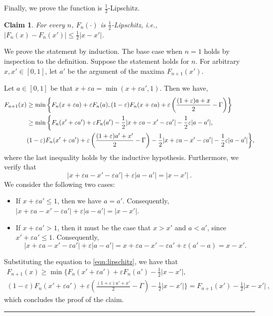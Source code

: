 \documentclass[11pt,letterpaper]{article}
\newenvironment{proof}{{\bf Proof:  }}{\hfill\rule{2mm}{2mm}\vspace*{5pt}}
\newtheorem{claim}{Claim}[section]
\newcommand{\eps}{\varepsilon}
\begin{document}
Finally, we prove the function is $\frac{1}{2}$-Lipschitz.
\begin{claim}
\label{cl:lipschitz}
For every $n$, $F_n(\cdot)$ is $\frac{1}{2}$-Lipschitz, i.e., $|F_n(x)-F_n(x')| \le \frac{1}{2} |x-x'|$.
\end{claim}
\begin{proof} 
We prove the statement by induction. The base case when $n=1$ holds by inspection to the definition. 
Suppose the statement holds for $n$. For arbitrary $x,x' \in [0,1]$, let $a'$ be the argument of the maxima $F_{n+1}(x')$. 


Let $a \in [0,1]$ be that $x+\eps a = \min(x+\eps a',1)$. Then we have,
\begin{align}
F_{n+1}(x) & \ge \min \left\{F_n(x+\eps a)+\eps F_n(a),  (1-\eps) F_n(x+\eps a) + \eps\left(\frac{(1+\eps)a + x}{2} - \Gamma \right) \right\} \notag \\
& \ge \min \bigg\{ F_n(x'+\eps a')+\eps F_n(a') - \frac{1}{2} |x+\eps a-x'-\eps a'| - \frac{1}{2} \eps |a-a'| , \notag \\
&  (1-\eps)F_n(x'+\eps a') + \eps \left(\frac{(1+\eps)a' + x'}{2} - \Gamma \right) - \frac{1}{2} |x+\eps a-x'-\eps a'| - \frac{1}{2} \eps|a-a'| \bigg\}, 
\label{eqn:lipschitz}
\end{align}
where the last inequality holds by the inductive hypothesis. Furthermore, we verify that
\[
|x+\eps a-x'-\eps a'|+\eps|a-a'| = |x-x'|~.
\]
We consider the following two cases:
\begin{itemize}
\item If $x+\eps a' \le 1$, then we have $a=a'$.	 Consequently, $|x+\eps a-x'-\eps a'| + \eps |a-a'| = |x-x'|$.
\item If $x+\eps a' > 1$, then it must be the case that $x>x'$ and $a<a'$, since $x'+\eps a'\le 1$. Consequently,
\[
|x+\eps a-x'-\eps a'| + \eps |a-a'| = x+\eps a - x'-\eps a' + \eps (a'-a) = x-x'.
\]
\end{itemize}
Substituting the equation to \eqref{eqn:lipschitz}, we have that
\begin{multline*}
F_{n+1}(x) \ge \min \Big\{ F_n(x'+\eps a')+\eps F_n(a') - \frac{1}{2} |x-x'|, \\
 (1-\eps)F_n(x'+\eps a') + \eps \left(\frac{(1+\eps)a' + x'}{2} - \Gamma \right) - \frac{1}{2} |x-x'|\Big\} = F_{n+1}(x')-\frac{1}{2} |x-x'|~,
\end{multline*}
which concludes  the proof of the claim.
\end{proof}
\end{document}
